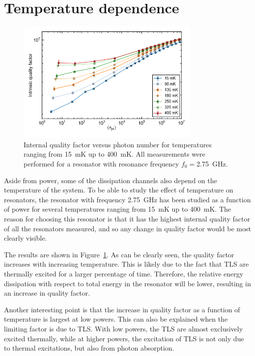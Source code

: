 \section{Temperature dependence}
\label{sec:resonator:results:emperature_dependence}
\begin{figure}
    \centering
    \includegraphics[width=0.8\textwidth]{Figures/DRIE/Qi_vs_n_photon_temperature_dependence.png}
    \caption{Internal quality factor versus photon number for temperatures ranging from \SI{15}{\milli \kelvin} up to \SI{400}{\milli \kelvin}. All measurements were performed for a resonator with resonance frequency $f_0 = $\SI{2.75}{\giga \hertz}.}
    \label{fig:Qi_vs_n_photon_temperature_dependence}
\end{figure}

Aside from power, some of the dissipation channels also depend on the temperature of the system. To be able to study the effect of temperature on resonators, the resonator with frequency \SI{2.75}{\giga \hertz} has been studied as a function of power for several temperatures ranging from \SI{15}{\milli \kelvin} up to \SI{400}{\milli \kelvin}. The reason for choosing this resonator is that it has the highest internal quality factor of all the resonators measured, and so any change in quality factor would be most clearly visible.

The results are shown in Figure~\ref{fig:Qi_vs_n_photon_temperature_dependence}. As can be clearly seen, the quality factor increases with increasing temperature. This is likely due to the fact that TLS are thermally excited for a larger percentage of time. Therefore, the relative energy dissipation with respect to total energy in the resonator will be lower, resulting in an increase in quality factor.

Another interesting point is that the increase in quality factor as a function of temperature is largest at low powers. This can also be explained when the limiting factor is due to TLS. With low powers, the TLS are almost exclusively excited thermally, while at higher powers, the excitation of TLS is not only due to thermal excitations, but also from photon absorption.

